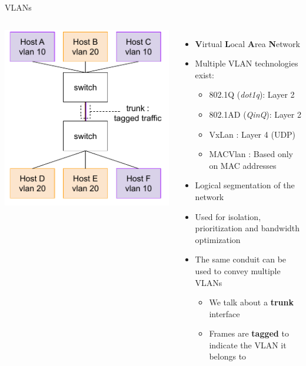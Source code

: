 \begin{frame}{VLANs}
	\begin{columns}
			\includegraphics[width=1.1\textwidth]{slides/networking-stack-overview/vlan_topo.pdf}
	\begin{itemize}
		\item \textbf{V}irtual \textbf{L}ocal \textbf{A}rea \textbf{N}etwork
		\item Multiple VLAN technologies exist:
			\begin{itemize}
				\item 802.1Q (\textit{dot1q}): Layer 2
				\item 802.1AD (\textit{QinQ}): Layer 2
				\item VxLan : Layer 4 (UDP)
				\item MACVlan : Based only on MAC addresses
			\end{itemize}
		\item Logical segmentation of the network
		\item Used for isolation, prioritization and bandwidth optimization
		\item The same conduit can be used to convey multiple VLANs
			\begin{itemize}
				\item We talk about a \textbf{trunk} interface
				\item Frames are \textbf{tagged} to indicate the VLAN it belongs to
			\end{itemize}
	\end{itemize}
	\end{columns}
\end{frame}

